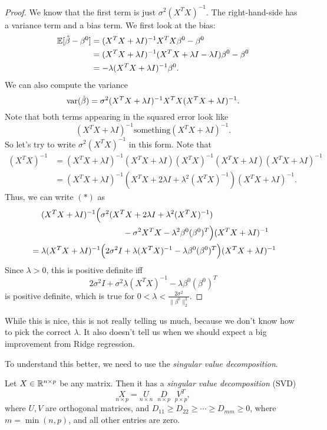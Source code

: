 \documentclass[a4paper]{article}
\begin{document}
\begin{proof}
  We know that the first term is just $\sigma^2(X^T X)^{-1}$. The right-hand-side has a variance term and a bias term. We first look at the bias:
  \begin{align*}
    \mathbb{E} [\hat{\beta} - \beta^0] &= (X^T X + \lambda I)^{-1} X^T X \beta^0 - \beta^0\\
    &= (X^T X + \lambda I)^{-1}(X^T X + \lambda I - \lambda I) \beta^0- \beta^0\\
    &= - \lambda (X^T X + \lambda I)^{-1} \beta^0.
  \end{align*}
  We can also compute the variance
  \[
    \operatorname{var}(\hat{\beta}) = \sigma^2(X^T X + \lambda I)^{-1} X^T X (X^T X + \lambda I)^{-1}.
  \]
  Note that both terms appearing in the squared error look like
  \[
    (X^T X + \lambda I)^{-1}\text{something}(X^T X + \lambda I)^{-1}.
  \]
  So let's try to write $\sigma^2 (X^T X)^{-1}$ in this form. Note that
  \begin{align*}
    (X^T X)^{-1} &= (X^T X + \lambda I)^{-1} (X^T X + \lambda I) (X^T X)^{-1} (X^T X + \lambda I) (X^T X + \lambda I)^{-1}\\
    &= (X^T X + \lambda I)^{-1}(X^T X + 2 \lambda I + \lambda^2 (X^T X)^{-1}) (X^T X + \lambda I)^{-1}.
  \end{align*}
  Thus, we can write $(*)$ as
  \begin{align*}
    &\hphantom{ {} = {} }(X^T X + \lambda I)^{-1} \Big( \sigma^2(X^T X + 2 \lambda I + \lambda^2(X^T X)^{-1})\\
    &\hphantom{adasdfafdasfdfadsfasdf}- \sigma^2 X^T X - \lambda^2 \beta^0 (\beta^0)^T\Big) (X^T X + \lambda I)^{-1}\\
    &= \lambda (X^T X + \lambda I)^{-1} \Big( 2 \sigma^2 I + \lambda(X^T X)^{-1} - \lambda \beta^0 (\beta^0)^T\Big) (X^T X + \lambda I)^{-1}
  \end{align*}
  Since $\lambda > 0$, this is positive definite iff
  \[
    2 \sigma^2 I + \sigma^2 \lambda (X^T X)^{-1} - \lambda \beta^0 (\beta^0)^T
  \]
  is positive definite, which is true for $0 < \lambda < \frac{2\sigma^2}{\|\beta^0\|_2^2}$.
\end{proof}
While this is nice, this is not really telling us much, because we don't know how to pick the correct $\lambda$. It also doesn't tell us when we should expect a big improvement from Ridge regression.

To understand this better, we need to use the \emph{singular value decomposition}.

\begin{thm}
  Let $X \in \mathbb{R}^{n \times p}$ be any matrix. Then it has a \emph{singular value decomposition} (SVD)
  \[
    \underset{n \times p}{X} = \underset{n \times n}{U}\;\;\underset{n \times p}{D}\;\;\underset{p \times p}{V^T},
  \]
  where $U, V$ are orthogonal matrices, and $D_{11} \geq D_{22} \geq \cdots \geq D_{mm} \geq 0$, where $m = \min (n, p)$, and all other entries are zero.
\end{thm}
\end{document}
